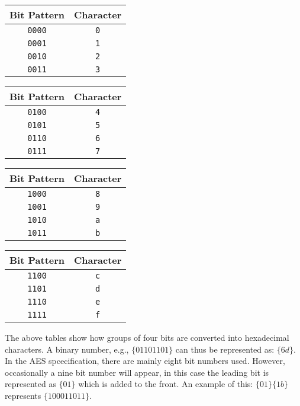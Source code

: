 \documentclass[10pt,letterpaper]{scrartcl}
\begin{document}
\begin{table}[!ht]
    \parbox{.5\linewidth}{
        \begin{tabular}{|c|c|}
            \hline 
            Bit Pattern & Character \\ \hline\hline 
            \texttt{0000} & \texttt{0} \\ \hline 
            \texttt{0001} & \texttt{1} \\ \hline 
            \texttt{0010} & \texttt{2} \\ \hline 
            \texttt{0011} & \texttt{3} \\ \hline 
        \end{tabular}
    }
    \hfill\parbox{.5\linewidth}{
        \begin{tabular}{| c | c |}
            \hline 
            Bit Pattern & Character \\ \hline\hline 
            \texttt{0100} & \texttt{4} \\ \hline 
            \texttt{0101} & \texttt{5} \\ \hline 
            \texttt{0110} & \texttt{6} \\ \hline 
            \texttt{0111} & \texttt{7} \\ \hline 
        \end{tabular}
    }
    \hfill\parbox{.5\linewidth}{
        \begin{tabular}{| c | c |}
            \hline
            Bit Pattern & Character \\ \hline\hline 
            \texttt{1000} & \texttt{8} \\ \hline 
            \texttt{1001} & \texttt{9} \\ \hline 
            \texttt{1010} & \texttt{a} \\ \hline 
            \texttt{1011} & \texttt{b} \\ \hline 
        \end{tabular}
    }
    \hfill\parbox{.5\linewidth}{
        \begin{tabular}{| c | c |}
            \hline
            Bit Pattern & Character \\ \hline\hline 
            \texttt{1100} & \texttt{c} \\ \hline 
            \texttt{1101} & \texttt{d} \\ \hline 
            \texttt{1110} & \texttt{e} \\ \hline 
            \texttt{1111} & \texttt{f} \\ \hline 
        \end{tabular}
    }
\end{table}
The above tables show how groups of four bits are converted into hexadecimal characters. A binary number, e.g., $\{01101101\}$ can thus be represented as: $\{6d\}$. In the AES spcecification, there are mainly eight bit numbers used. However, occasionally a nine bit number will appear, in this case the leading bit is represented as $\{01\}$ which is added to the front. An example of this: $\{01\}\{1b\}$ represents $\{100011011\}$.
\end{document}
